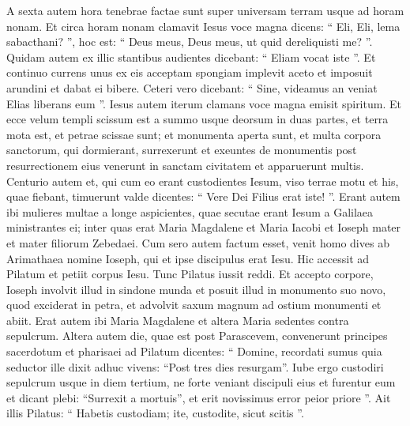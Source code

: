 \begin{biblechapter}
\begin{biblechapter}
\begin{biblechapter}
\begin{biblechapter}
\begin{biblechapter}
\begin{biblechapter}
\begin{biblechapter}
\begin{biblechapter}
\begin{biblechapter}
\begin{biblechapter}
\begin{biblechapter}
\begin{biblechapter}
\begin{biblechapter}
\begin{biblechapter}
\begin{biblechapter}
\begin{biblechapter}
\begin{biblechapter}
\begin{biblechapter}
\begin{biblechapter}
\begin{biblechapter}
\begin{biblechapter}
\begin{biblechapter}
\begin{biblechapter}
\begin{biblechapter}
\begin{biblechapter}
\begin{biblechapter}
\begin{biblechapter}
 \verse A sexta autem hora tenebrae factae sunt super universam terram usque ad horam nonam. 
\verse Et circa horam nonam clamavit Iesus voce magna dicens: “ Eli, Eli, lema sabacthani? ”, hoc est: “ Deus meus, Deus meus, ut quid dereliquisti me? ”. 
 \verse Quidam autem ex illic stantibus audientes dicebant: “ Eliam vocat iste ”. 
 \verse Et continuo currens unus ex eis acceptam spongiam implevit aceto et imposuit arundini et dabat ei bibere. 
\verse Ceteri vero dicebant: “ Sine, videamus an veniat Elias liberans eum ”. 
\verse Iesus autem iterum clamans voce magna emisit spiritum.
 \verse Et ecce velum templi scissum est a summo usque deorsum in duas partes, et terra mota est, et petrae scissae sunt; 
\verse et monumenta aperta sunt, et multa corpora sanctorum, qui dormierant, surrexerunt 
\verse et exeuntes de monumentis post resurrectionem eius venerunt in sanctam civitatem et apparuerunt multis. 
\verse Centurio autem et, qui cum eo erant custodientes Iesum, viso terrae motu et his, quae fiebant, timuerunt valde dicentes: “ Vere Dei Filius erat iste! ”.
 \verse Erant autem ibi mulieres multae a longe aspicientes, quae secutae erant Iesum a Galilaea ministrantes ei; 
\verse inter quas erat Maria Magdalene et Maria Iacobi et Ioseph mater et mater filiorum Zebedaei.
 \verse Cum sero autem factum esset, venit homo dives ab Arimathaea nomine Ioseph, qui et ipse discipulus erat Iesu. 
\verse Hic accessit ad Pilatum et petiit corpus Iesu. Tunc Pilatus iussit reddi. 
\verse Et accepto corpore, Ioseph involvit illud in sindone munda 
\verse et posuit illud in monumento suo novo, quod exciderat in petra, et advolvit saxum magnum ad ostium monumenti et abiit. 
 \verse Erat autem ibi Maria Magdalene et altera Maria sedentes contra sepulcrum.
 \verse Altera autem die, quae est post Parascevem, convenerunt principes sacerdotum et pharisaei ad Pilatum 
\verse dicentes: “ Domine, recordati sumus quia seductor ille dixit adhuc vivens: “Post tres dies resurgam”. 
\verse Iube ergo custodiri sepulcrum usque in diem tertium, ne forte veniant discipuli eius et furentur eum et dicant plebi: “Surrexit a mortuis”, et erit novissimus error peior priore ”. 
 \verse Ait illis Pilatus: “ Habetis custodiam; ite, custodite, sicut scitis ”. 

\end{biblechapter}
\end{biblechapter}
\end{biblechapter}
\end{biblechapter}
\end{biblechapter}
\end{biblechapter}
\end{biblechapter}
\end{biblechapter}
\end{biblechapter}
\end{biblechapter}
\end{biblechapter}
\end{biblechapter}
\end{biblechapter}
\end{biblechapter}
\end{biblechapter}
\end{biblechapter}
\end{biblechapter}
\end{biblechapter}
\end{biblechapter}
\end{biblechapter}
\end{biblechapter}
\end{biblechapter}
\end{biblechapter}
\end{biblechapter}
\end{biblechapter}
\end{biblechapter}
\end{biblechapter}
